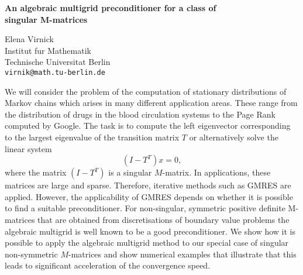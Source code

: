 \documentclass{report}
\begin{document}

\begin{center}
{\large
{\bf An algebraic multigrid preconditioner for a class of \\
	singular M-matrices}}

	Elena Virnick \\
	Institut f\:ur Mathematik \\
	Technische Universit\:at Berlin \\
	{\tt virnik@math.tu-berlin.de}
\end{center}
We will consider the problem of the computation of stationary
distributions of Markov chains which arises in many different
application areas. These range from the distribution of drugs
in the blood circulation systems to the Page Rank computed by
Google. The task is to compute the left eigenvector
corresponding to the largest eigenvalue of the transition
matrix $T$ or alternatively solve the linear system
$$(I-T^T)x=0,$$
where the matrix $(I-T^T)$ is a singular $M$-matrix.
In applications, these matrices are large and sparse.
Therefore, iterative methods such as GMRES are applied.
However, the applicability of GMRES depends on whether
it is possible to find a suitable preconditioner.
For non-singular, symmetric positive definite M-matrices
that are obtained from discretisations of boundary
value problems the algebraic multigrid is well known
to be a good preconditioner. We show how it is possible
to apply the algebraic multigrid method to our special
case of singular non-symmetric $M$-matrices and show
numerical examples that illustrate that this leads to
significant acceleration of the convergence speed.


\end{document}
